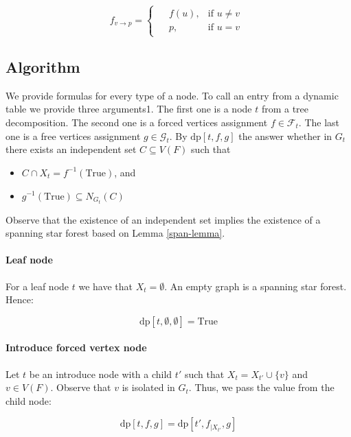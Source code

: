 \documentclass[en]{pracamgr}
\theoremstyle{definition}
\newcommand{\dpt}[1]{\textrm{dp}[#1]}
\newcommand{\true}{\textrm{True}}
\begin{document}
\begin{equation*}
	f_{v \rightarrow p} =
	\begin{cases}
	\begin{aligned}
		&f(u), & \text{if $u \neq v$} \\
		&p, &\text{if $u = v$}
	\end{aligned}
	\end{cases}
\end{equation*}

\subsection{Algorithm}

We provide formulas for every type of a node. To call an entry from a dynamic table we provide three arguments1. The first one is a node $t$ from a tree decomposition. The second one is a forced vertices assignment $f \in \mathcal{F}_t$. The last one is  a free vertices assignment $g \in \mathcal{G}_t$. By $\dpt{t,f,g}$ the answer whether in $G_t$ there exists an independent set $C \subseteq V(F)$ such that
\begin{itemize}
	\item $C \cap X_t = f^{-1}(\true)$, and
	\item $g^{-1}(\true) \subseteq N_{G_t}(C)$
\end{itemize}

Observe that the existence of an independent set implies the existence of a spanning star forest based on Lemma \ref{span-lemma}.

\paragraph{Leaf node} For a leaf node $t$ we have that $X_t=\emptyset$. An empty graph is a spanning star forest. Hence:

\begin{equation*}
	\dpt{t,\emptyset,\emptyset}=\true
\end{equation*}

\paragraph{Introduce forced vertex node} Let $t$ be an introduce node with a child $t'$ such that $X_t = X_{t'} \cup \{v\}$ and $v \in V(F)$. Observe that $v$ is isolated in $G_t$. Thus, we pass the value from the child node:

\begin{equation*}
	\dpt{t,f,g}= \dpt{t',f_{|X_{t'}},g}
\end{equation*}
\end{document}
